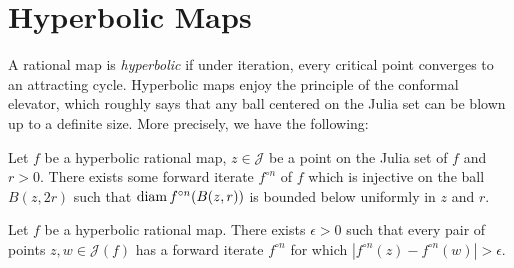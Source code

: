 \begin{comment}
\begin{proof}
Formally, $\overline{\psi}(\overline{z})$
	is another conformal conjugacy between $f$ and $f_0$ which fixes infinity, so by uniqueness of the Böttcher coordinate we obtain $\psi(z)=\overline{\psi}(\overline{z})$,
	hence $\psi(z)\in\R$ for $z\in\R$.
\end{proof}
\end{comment}

\section{Hyperbolic Maps}

A rational map is \emph{hyperbolic} if under iteration, every critical point converges to an attracting cycle.
Hyperbolic maps enjoy the principle of the conformal elevator, which roughly says that any ball centered on the Julia set can be blown up to a definite size. More precisely, we have the following:

\begin{proposition} \label{elevator}
	Let $f$ be a hyperbolic rational map, $z\in \mathcal J$ be a point on the Julia set of $f$ and $r>0$. There exists some forward iterate $f^{\circ n}$ of $f$ which is injective on the ball $B(z,2r)$ such that
	$\operatorname{diam} {f^{\circ n}(B(z,r))}$ is bounded below uniformly in $z$ and $r$. 
\end{proposition}


\begin{corollary} \label{elevator for points on julia}
	Let $f$ be a hyperbolic rational map. There exists  $\epsilon > 0$ such that every pair of points $z,w\in\mathcal{J}(f)$ has a forward iterate $f^{\circ n}$ for which $\left|f^{\circ n}(z)-f^{\circ n}(w)\right|>\epsilon$.	
\end{corollary}

\begin{comment}
\begin{proof}
	Apply \cref{elevator} to a ball centered on the Julia set which contains $z,w$ on its boundary at roughly antipodal points. After blowing up we get points $f^{\circ n}(z),f^{\circ n}(w)$ which are a definite distance apart by Koebe's distortion theorem. %
\end{proof}
\end{comment}

